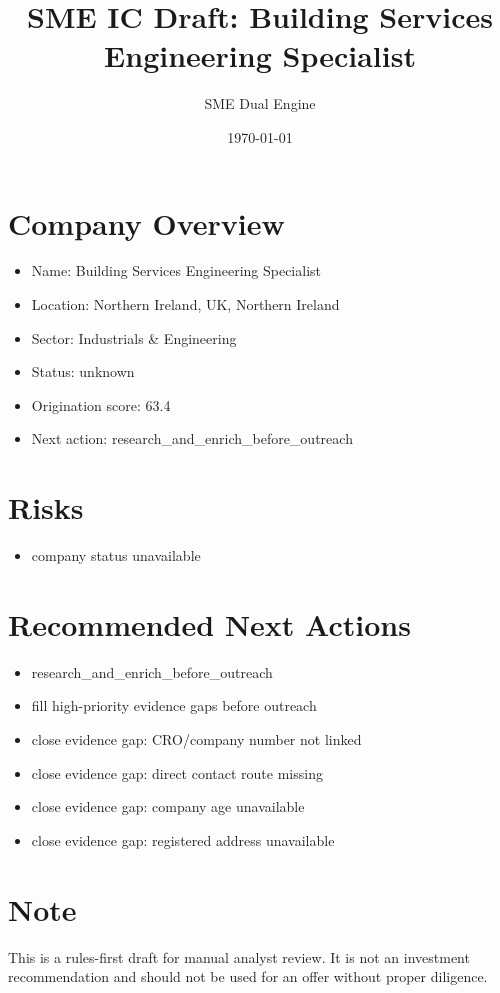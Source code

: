 \documentclass[11pt,a4paper]{article}
\title{SME IC Draft: Building Services Engineering Specialist}
\author{SME Dual Engine}
\date{\today}
\begin{document}
\maketitle
\section*{Company Overview}
\begin{itemize}[leftmargin=1.4em]
\item Name: Building Services Engineering Specialist
\item Location: Northern Ireland, UK, Northern Ireland
\item Sector: Industrials \& Engineering
\item Status: unknown
\item Origination score: 63.4
\item Next action: research\_and\_enrich\_before\_outreach
\end{itemize}
\section*{Risks}
\begin{itemize}[leftmargin=1.4em]
\item company status unavailable
\end{itemize}
\section*{Recommended Next Actions}
\begin{itemize}[leftmargin=1.4em]
\item research\_and\_enrich\_before\_outreach
\item fill high-priority evidence gaps before outreach
\item close evidence gap: CRO/company number not linked
\item close evidence gap: direct contact route missing
\item close evidence gap: company age unavailable
\item close evidence gap: registered address unavailable
\end{itemize}
\section*{Note}
This is a rules-first draft for manual analyst review. It is not an investment
recommendation and should not be used for an offer without proper diligence.
\end{document}
